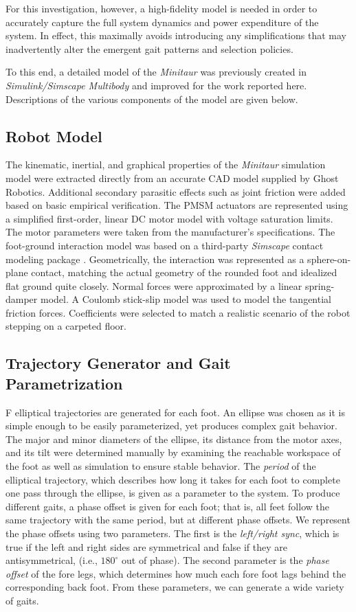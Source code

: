 \documentclass[conference,11pt,letterpaper]{IEEEtran}
\begin{document}
For this investigation, however, a high-fidelity model is needed in order to accurately capture the full system dynamics and power expenditure of the system. In effect, this maximally avoids introducing any simplifications that may inadvertently alter the emergent gait patterns and selection policies.

To this end, a detailed model of the \emph{Minitaur} was previously created in \emph{Simulink/Simscape Multibody} and improved for the work reported here. Descriptions of the various components of the model are given below.

\subsection{Robot Model}
The kinematic, inertial, and graphical properties of the \emph{Minitaur} simulation model were extracted directly from an accurate CAD model supplied by Ghost Robotics. Additional secondary parasitic effects such as joint friction were added based on basic empirical verification. The PMSM actuators are represented using a simplified first-order, linear DC motor model with voltage saturation limits. The motor parameters were taken from the manufacturer's specifications. The foot-ground interaction model was based on a third-party \emph{Simscape} contact modeling package \autocite{contactmodel}. Geometrically, the interaction was represented as a sphere-on-plane contact, matching the actual geometry of the rounded foot and idealized flat ground quite closely. Normal forces were approximated by a linear spring-damper model. A Coulomb stick-slip model was used to model the tangential friction forces. Coefficients were selected to match a realistic scenario of the robot stepping on a carpeted floor.


\subsection{Trajectory Generator and Gait Parametrization}
F elliptical trajectories are generated for each foot. An ellipse was chosen as it is simple enough to be easily parameterized, yet produces complex gait behavior. The major and minor diameters of the ellipse, its distance from the motor axes, and its tilt were determined manually by examining the reachable workspace of the foot as well as simulation to ensure stable behavior. The \emph{period} of the elliptical trajectory, which describes how long it takes for each foot to complete one pass through the ellipse, is given as a parameter to the system. To produce different gaits, a phase offset is given for each foot; that is, all feet follow the same trajectory with the same period, but at different phase offsets.  We represent the phase offsets using two parameters. The first is the \emph{left/right sync}, which is true if the left and right sides are symmetrical and false if they are antisymmetrical, (i.e., $180^\circ$ out of phase). The second parameter is the \emph{phase offset} of the fore legs, which determines how much each fore foot lags behind the corresponding back foot. From these parameters, we can generate a wide variety of gaits.
\end{document}
